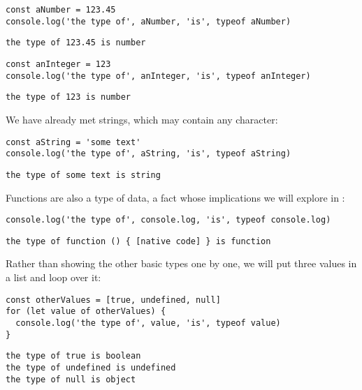 \begin{verbatim}
const aNumber = 123.45
console.log('the type of', aNumber, 'is', typeof aNumber)
\end{verbatim}

\begin{verbatim}
the type of 123.45 is number
\end{verbatim}

\begin{verbatim}
const anInteger = 123
console.log('the type of', anInteger, 'is', typeof anInteger)
\end{verbatim}

\begin{verbatim}
the type of 123 is number
\end{verbatim}

We have already met strings,
which may contain any  character:

\begin{verbatim}
const aString = 'some text'
console.log('the type of', aString, 'is', typeof aString)
\end{verbatim}

\begin{verbatim}
the type of some text is string
\end{verbatim}

Functions are also a type of data,
a fact whose implications we will explore in :

\begin{verbatim}
console.log('the type of', console.log, 'is', typeof console.log)
\end{verbatim}

\begin{verbatim}
the type of function () { [native code] } is function
\end{verbatim}

Rather than showing the other basic types one by one,
we will put three values in a list and loop over it:

\begin{verbatim}
const otherValues = [true, undefined, null]
for (let value of otherValues) {
  console.log('the type of', value, 'is', typeof value)
}
\end{verbatim}

\begin{verbatim}
the type of true is boolean
the type of undefined is undefined
the type of null is object
\end{verbatim}

